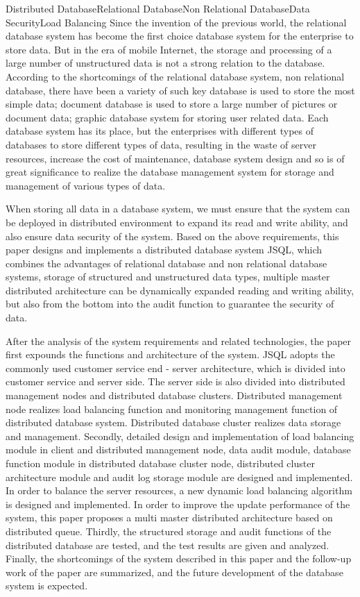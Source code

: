 
\begin{Eabstract}{Distributed Database}{Relational Database}{Non Relational Database}{Data Security}{Load Balancing}
Since the invention of the previous world, the relational database system has become the first choice database system for the enterprise to store data. But in the era of mobile Internet, the storage and processing of a large number of unstructured data is not a strong relation to the database. According to the shortcomings of the relational database system, non relational database, there have been a variety of such key database is used to store the most simple data; document database is used to store a large number of pictures or document data; graphic database system for storing user related data.
Each database system has its place, but the enterprises with different types of databases to store different types of data, resulting in the waste of server resources, increase the cost of maintenance, database system design and so is of great significance to realize the database management system for storage and management of various types of data.

When storing all data in a database system, we must ensure that the system can be deployed in distributed environment to expand its read and write ability, and also ensure data security of the system. Based on the above requirements, this paper designs and implements a distributed database system JSQL, which combines the advantages of relational database and non relational database systems, storage of structured and unstructured data types, multiple master distributed architecture can be dynamically expanded reading and writing ability, but also from the bottom into the audit function to guarantee the security of data.

After the analysis of the system requirements and related technologies, the paper first expounds the functions and architecture of the system.
JSQL adopts the commonly used customer service end - server architecture, which is divided into customer service and server side.
The server side is also divided into distributed management nodes and distributed database clusters.
Distributed management node realizes load balancing function and monitoring management function of distributed database system. Distributed database cluster realizes data storage and management. Secondly, detailed design and implementation of load balancing module in client and distributed management node, data audit module, database function module in distributed database cluster node, distributed cluster architecture module and audit log storage module are designed and implemented. In order to balance the server resources, a new dynamic load balancing algorithm is designed and implemented. In order to improve the update performance of the system, this paper proposes a multi master distributed architecture based on distributed queue. Thirdly, the structured storage and audit functions of the distributed database are tested, and the test results are given and analyzed. Finally, the shortcomings of the system described in this paper and the follow-up work of the paper are summarized, and the future development of the database system is expected.
\end{Eabstract}
